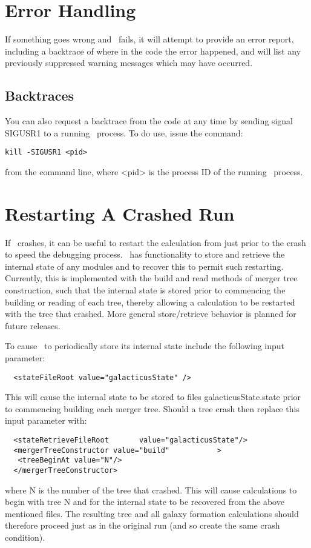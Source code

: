 \section{Error Handling}

If something goes wrong and \glc\ fails, it will attempt to provide an error report, including a backtrace of where in the code the error happened, and will list any previously suppressed warning messages which may have occurred.

\subsection{Backtraces}

You can also request a backtrace from the code at any time by sending signal {\normalfont \ttfamily SIGUSR1} to a running \glc\ process. To do use, issue the command:
\begin{verbatim}
kill -SIGUSR1 <pid>
\end{verbatim}
from the command line, where {\normalfont \ttfamily \textless pid\textgreater} is the process ID of the running \glc\ process.

\section{Restarting A Crashed Run}\label{sec:Restarting}

If \glc\ crashes, it can be useful to restart the calculation from just prior to the crash to speed the debugging process. \glc\ has functionality to store and retrieve the internal state of any modules and to recover this to permit such restarting. Currently, this is implemented with the {\normalfont \ttfamily build} and {\normalfont \ttfamily read} methods of merger tree construction, such that the internal state is stored prior to commencing the building or reading of each tree, thereby allowing a calculation to be restarted with the tree that crashed. More general store/retrieve behavior is planned for future releases.

To cause \glc\ to periodically store its internal state include the following input parameter:
\begin{verbatim}
  <stateFileRoot value="galacticusState" />
\end{verbatim}
This will cause the internal state to be stored to files {\normalfont \ttfamily galacticusState.state} prior to commencing building each merger tree. Should a tree crash then replace this input parameter with:
\begin{verbatim}
  <stateRetrieveFileRoot       value="galacticusState"/>
  <mergerTreeConstructor value="build"           >
   <treeBeginAt value="N"/>
  </mergerTreeConstructor>
\end{verbatim}
where {\normalfont \ttfamily N} is the number of the tree that crashed. This will cause calculations to begin with tree {\normalfont \ttfamily N} and for the internal state to be recovered from the above mentioned files. The resulting tree and all galaxy formation calculations should therefore proceed just as in the original run (and so create the same crash condition).

